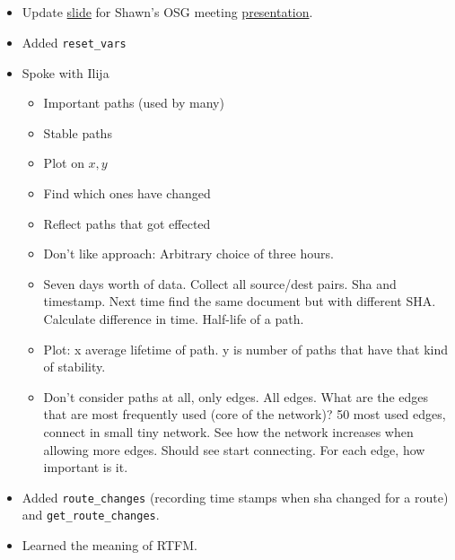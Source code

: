 \documentclass{weeklyreport}
\begin{document}
\subsection*{}

\begin{itemize}
    \item Update \href{https://docs.google.com/presentation/d/1yhZD00L6rmlWaZqEWuJoyxXHYd7ig2KCs5Pt1tcVJmI/edit#slide=id.g5a8e0793b9_0_0}{slide} for Shawn's OSG meeting \href{https://docs.google.com/presentation/d/1Np9QAO-8Vcp2hRg7aPXhkaw-PlBhvpp1aMLx4lepfeM/edit?pli=1#slide=id.g5336f274a0_0_183}{presentation}.
    \item Added \texttt{reset\_vars}
    \item Spoke with Ilija
    \begin{itemize}
    	\item Important paths (used by many)
    	\item Stable paths
    	\item Plot on $x, y$
    	\item Find which ones have changed
    	\item Reflect paths that got effected
    	\item Don't like approach: Arbitrary choice of three hours.
    	\item Seven days worth of data. Collect all source/dest pairs. Sha and timestamp. Next time find the same document but with different SHA. Calculate difference in time. Half-life of a path.
    	\item Plot: x average lifetime of path. y is number of paths that have that kind of stability.
    	\item Don't consider paths at all, only edges. All edges. What are the edges that are most frequently used (core of the network)? 50 most used edges, connect in small tiny network. See how the network increases when allowing more edges. Should see start connecting. For each edge, how important is it.
    \end{itemize}
    \item Added \texttt{route\_changes} (recording time stamps when sha changed for a route) and \texttt{get\_route\_changes}.
    \item Learned the meaning of RTFM.
\end{itemize}

\subsection*{}
\end{document}
